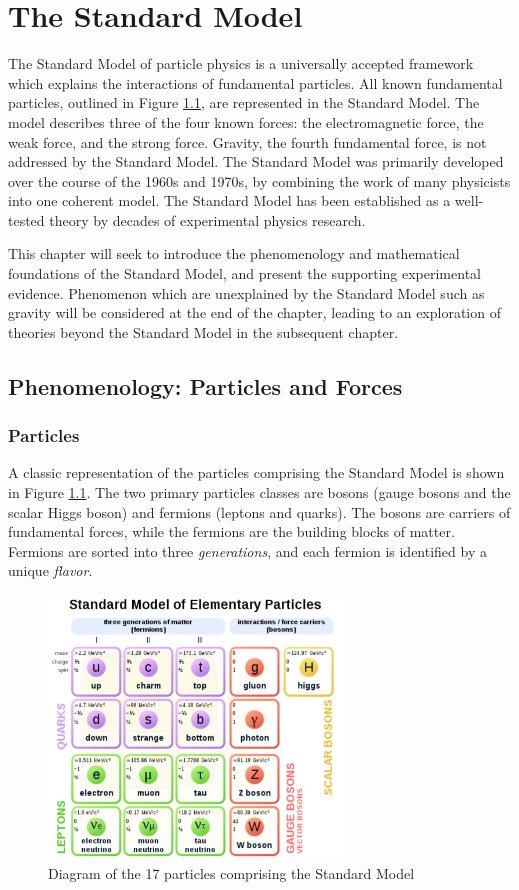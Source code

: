 \chapter{The Standard Model}
The Standard Model of particle physics is a universally accepted framework which explains the interactions of fundamental particles. All known fundamental particles, outlined in Figure \ref{fig:sm}, are represented in the Standard Model. The model describes three of the four known forces: the electromagnetic force, the weak force, and the strong force. Gravity, the fourth fundamental force, is not addressed by the Standard Model. The Standard Model was primarily developed over the course of the 1960s and 1970s, by combining the work of many physicists into one coherent model. The Standard Model has been established as a well-tested theory by decades of experimental physics research.\par

This chapter will seek to introduce the phenomenology and mathematical foundations of the Standard Model, and present the supporting experimental evidence. Phenomenon which are unexplained by the Standard Model such as gravity will be considered at the end of the chapter, leading to an exploration of theories beyond the Standard Model in the subsequent chapter.

\section{Phenomenology: Particles and Forces}
\subsection{Particles}
A classic representation of the particles comprising the Standard Model is shown in Figure \ref{fig:sm}. The two primary particles classes are bosons (gauge bosons and the scalar Higgs boson) and fermions (leptons and quarks). The bosons are carriers of fundamental forces, while the fermions are the building blocks of matter. Fermions are sorted into three \textit{generations}, and each fermion is identified by a unique \textit{flavor}.

\begin{figure}
        \centering
	\includegraphics[width=0.7\textwidth]{figures/ch1/standard_model.png}
	\caption{Diagram of the 17 particles comprising the Standard Model}
	\label{fig:sm}
\end{figure}

